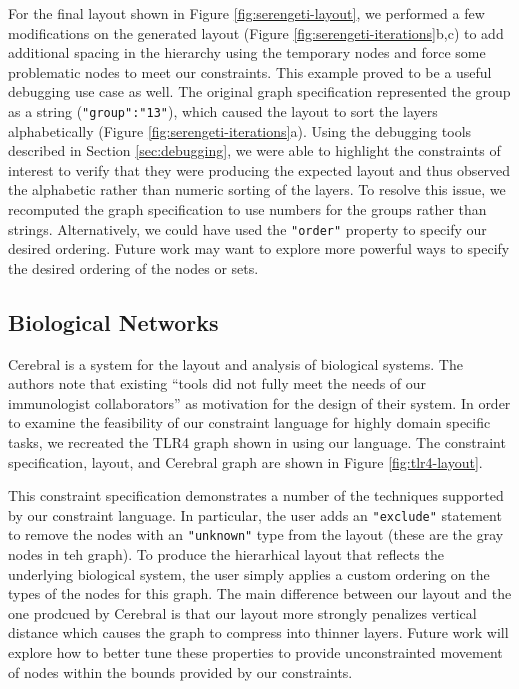 \serengetiIterations
\tlrFourLayout
For the final layout shown in Figure \ref{fig:serengeti-layout}, we performed a few modifications on the generated layout (Figure \ref{fig:serengeti-iterations}b,c) to add additional spacing in the hierarchy using the temporary nodes and force some problematic nodes to meet our constraints. This example proved to be a useful debugging use case as well. The original graph specification represented the group as a string (\texttt{"group":"13"}), which caused the layout to sort the layers alphabetically (Figure \ref{fig:serengeti-iterations}a). Using the debugging tools described in Section \ref{sec:debugging}, we were able to highlight the constraints of interest to verify that they were producing the expected layout and thus observed the alphabetic rather than numeric sorting of the layers. To resolve this issue, we recomputed the graph specification to use numbers for the groups rather than strings. Alternatively, we could have used the \texttt{"order"} property to specify our desired ordering. Future work may want to explore more powerful ways to specify the desired ordering of the nodes or sets.

\subsection{Biological Networks}
Cerebral \cite{barsky2008cerebral} is a system for the layout and analysis of biological systems. The authors note that existing ``tools did not fully meet the needs of our immunologist collaborators'' as motivation for the design of their system. In order to examine the feasibility of our constraint language for highly domain specific tasks, we recreated the TLR4 graph shown in \cite{barsky2008cerebral} using our language. The constraint specification, layout, and Cerebral graph are shown in Figure \ref{fig:tlr4-layout}.

This constraint specification demonstrates a number of the techniques supported by our constraint language. In particular, the user adds an \texttt{"exclude"} statement to remove the nodes with an \texttt{"unknown"} type from the layout (these are the gray nodes in teh graph). To produce the hierarhical layout that reflects the underlying biological system, the user simply applies a custom ordering on the types of the nodes for this graph. The main difference between our layout and the one prodcued by Cerebral is that our layout more strongly penalizes vertical distance which causes the graph to compress into thinner layers. Future work will explore how to better tune these properties to provide unconstrainted movement of nodes within the bounds provided by our constraints.
